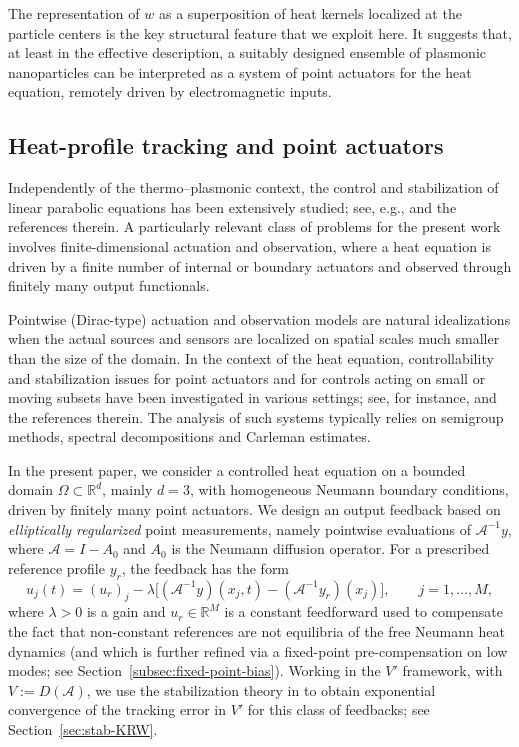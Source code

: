 \documentclass[11pt,a4paper]{article}
\numberwithin{equation}{section}
\theoremstyle{definition}
\newcommand{\R}{\mathbb{R}}
\newcommand{\1}{\mathbbm{1}}
\begin{document}
\noindent The representation of $w$ as a superposition of heat kernels localized at the
particle centers is the key structural feature that we exploit here. It
suggests that, at least in the effective description, a suitably designed
ensemble of plasmonic nanoparticles can be interpreted as a system of point
actuators for the heat equation, remotely driven by electromagnetic inputs.

\subsection{Heat-profile tracking and point actuators}

\noindent  Independently of the thermo--plasmonic context, the control and stabilization
of linear parabolic equations has been extensively studied; see, e.g.,
\cite{Barbu2018,KrsticSmyshlyaev2008,Pazy1983,TucsnakWeiss2009,RaymondBook}
and the references therein. A particularly relevant class of problems for the
present work involves finite-dimensional actuation and observation, where a
heat equation is driven by a finite number of internal or boundary actuators
and observed through finitely many output functionals.

\noindent Pointwise (Dirac-type) actuation and observation models are natural
idealizations when the actual sources and sensors are localized on spatial
scales much smaller than the size of the domain. In the context of the heat
equation, controllability and stabilization issues for point actuators and for
controls acting on small or moving subsets have been investigated in various
settings; see, for instance, \cite{CasZuazua,
FardigolaKhalina2022,Hamidoglu2013,Letrouit2019, Martinez2015,Rodrigues2021} and the references
therein. The analysis of such systems typically relies on semigroup methods,
spectral decompositions and Carleman estimates.
\bigskip

\noindent In the present paper, we consider a controlled heat equation on a bounded
domain $\Omega\subset\R^d$, mainly $d=3$, with homogeneous Neumann boundary conditions, driven by finitely many point actuators. We design an output feedback based on
\emph{elliptically regularized} point measurements, namely pointwise
evaluations of $\mathcal A^{-1}y$, where $\mathcal A=I-A_0$ and $A_0$ is the
Neumann diffusion operator. For a prescribed reference profile $y_r$, the
feedback has the form
\[
u_j(t) = (u_r)_j-\lambda\Big[(\mathcal A^{-1}y)(x_j,t) - (\mathcal A^{-1}y_r)(x_j)\Big],
\qquad j=1,\dots,M,
\]
where $\lambda>0$ is a gain and $u_r\in\R^M$ is a constant feedforward used to
compensate the fact that non-constant references are not equilibria of the
free Neumann heat dynamics (and which is further refined via a fixed-point
pre-compensation on low modes; see Section~\ref{subsec:fixed-point-bias}).
Working in the $V'$ framework, with $V:=D(\mathcal A)$, we use the stabilization theory in \cite{KunRodWal24-cocv} to obtain exponential convergence of the tracking
error in $V'$ for this class of feedbacks; see Section~\ref{sec:stab-KRW}.
\end{document}
